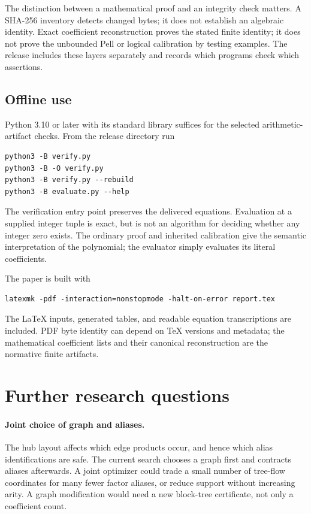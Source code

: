 \documentclass[11pt,letterpaper]{article}
\theoremstyle{definition}\newtheorem{definition}[theorem]{Definition}
\theoremstyle{remark}\newtheorem{remark}[theorem]{Remark}
\begin{document}


The distinction between a mathematical proof and an integrity check matters.
A SHA-256 inventory detects changed bytes; it does not establish an
algebraic identity. Exact coefficient reconstruction proves the stated
finite identity; it does not prove the unbounded Pell or logical
calibration by testing examples. The release includes these layers
separately and records which programs check which assertions.

\subsection{Offline use}

Python 3.10 or later with its standard library suffices for the selected
arithmetic-artifact checks. From the release directory run
\begin{lstlisting}
python3 -B verify.py
python3 -B -O verify.py
python3 -B verify.py --rebuild
python3 -B evaluate.py --help
\end{lstlisting}
The verification entry point preserves the delivered equations. Evaluation
at a supplied integer tuple is exact, but is not an algorithm for deciding
whether any integer zero exists. The ordinary proof and inherited
calibration give the semantic interpretation of the polynomial; the
evaluator simply evaluates its literal coefficients.

The paper is built with
\begin{lstlisting}
latexmk -pdf -interaction=nonstopmode -halt-on-error report.tex
\end{lstlisting}
The LaTeX inputs, generated tables, and readable equation transcriptions are
included. PDF byte identity can depend on TeX versions and metadata; the
mathematical coefficient lists and their canonical reconstruction are the
normative finite artifacts.

\section{Further research questions}
\label{sec:future}

\paragraph{Joint choice of graph and aliases.}
The hub layout affects which edge products occur, and hence which alias
identifications are safe. The current search chooses a graph first and
contracts aliases afterwards. A joint optimizer could trade a small number
of tree-flow coordinates for many fewer factor aliases, or reduce support
without increasing arity. A graph modification would need a new block-tree
certificate, not only a coefficient count.
\end{document}
